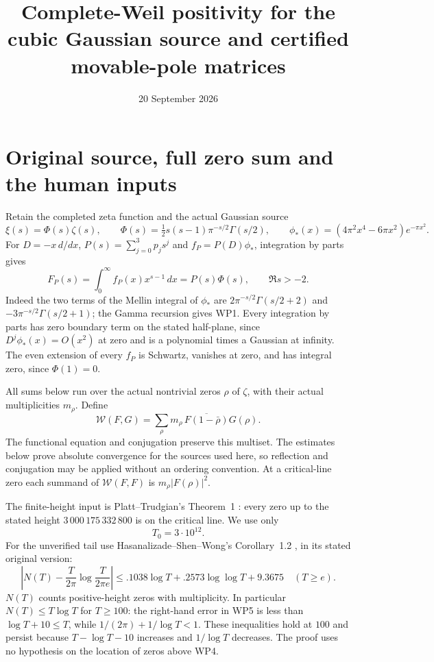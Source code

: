 \documentclass[11pt]{article}
\title{Complete-Weil positivity for the cubic Gaussian source and certified movable-pole matrices}
\author{}
\date{20 September 2026}
\newcommand{\W}{\mathcal W}
\begin{document}
\maketitle

\section{Original source, full zero sum and the human inputs}
Retain the completed zeta function and the actual Gaussian source
\[
 \xi(s)=\Phi(s)\zeta(s),\qquad
 \Phi(s)=\tfrac12s(s-1)\pi^{-s/2}\Gamma(s/2),\qquad
 \phi_*(x)=(4\pi^2x^4-6\pi x^2)e^{-\pi x^2}.                 \tag{WP1}
\]
For $D=-x\,d/dx$, $P(s)=\sum_{j=0}^3p_js^j$ and
$f_P=P(D)\phi_*$, integration by parts gives
\[
 F_P(s)=\int_0^\infty f_P(x)x^{s-1}\,dx=P(s)\Phi(s),
                  \qquad \Re s>-2.                            \tag{WP2}
\]
Indeed the two terms of the Mellin integral of $\phi_*$ are
$2\pi^{-s/2}\Gamma(s/2+2)$ and
$-3\pi^{-s/2}\Gamma(s/2+1)$; the Gamma recursion gives WP1.
Every integration by parts has zero boundary term on the stated
half-plane, since $D^j\phi_*(x)=O(x^2)$ at zero and is a polynomial
times a Gaussian at infinity. The even extension of every $f_P$ is
Schwartz, vanishes at zero, and has integral zero, since $\Phi(1)=0$.

All sums below run over the actual nontrivial zeros $\rho$ of $\zeta$,
with their actual multiplicities $m_\rho$. Define
\[
 \W(F,G)=\sum_\rho m_\rho\,
       \overline{F(1-\bar\rho)}G(\rho).                         \tag{WP3}
\]
The functional equation and conjugation preserve this multiset.
The estimates below prove absolute convergence for the sources
used here, so reflection and conjugation may be applied without
an ordering convention. At a critical-line zero each summand of
$\W(F,F)$ is $m_\rho|F(\rho)|^2$.

The finite-height input is Platt--Trudgian's Theorem~1
\cite{PlattTrudgian}: every zero up to the stated height
$3\,000\,175\,332\,800$ is on the critical line. We use only
\[
                         T_0=3\cdot10^{12}.                    \tag{WP4}
\]
For the unverified tail use Hasanalizade--Shen--Wong's
Corollary~1.2 \cite{HSW}, in its stated original version:
\[
 \left|N(T)-\frac{T}{2\pi}\log\frac{T}{2\pi e}\right|
 \le .1038\log T+.2573\log\log T+9.3675\quad(T\ge e).          \tag{WP5}
\]
$N(T)$ counts positive-height zeros with multiplicity. In particular
$N(T)\le T\log T$ for $T\ge100$: the right-hand error in WP5 is
less than $\log T+10\le T$, while
$1/(2\pi)+1/\log T<1$. These inequalities hold at $100$ and
persist because $T-\log T-10$ increases and $1/\log T$ decreases.
The proof uses no hypothesis on the location of zeros above WP4.
\end{document}
